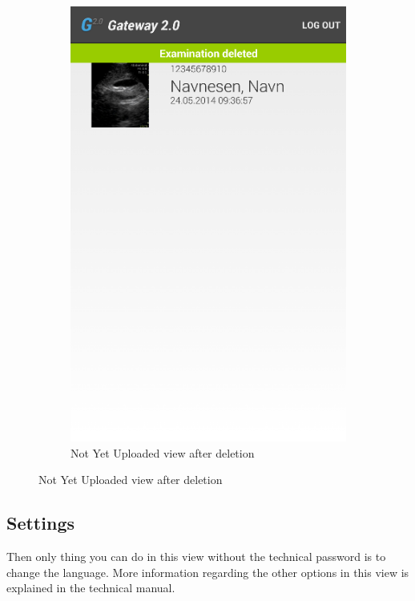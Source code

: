 \begin{figure}[H]
\begin{subfigure}[b]{0.49\textwidth}
        \includegraphics[width=\textwidth]{img/interface/13-NotYetUploadedPostDelete.png}
        \caption*{Not Yet Uploaded view after deletion}
        \label{fig:13notyetuploadedpost}
    \end{subfigure}
\end{figure}

\newpage
\subsection*{Settings}
Then only thing you can do in this view without the technical password is to change the language. More information regarding the other options in this view is explained in the technical manual.

